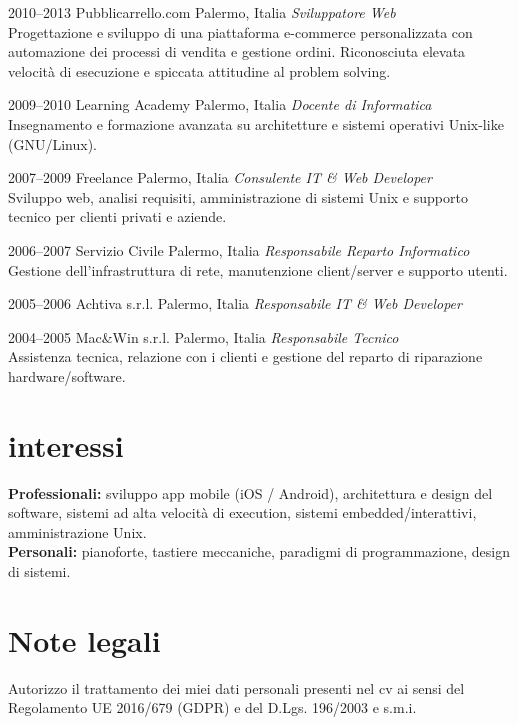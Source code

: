 \documentclass[]{friggeri-cv} %
\begin{document}
\begin{entrylist}
\entry
{2010--2013}
{Pubblicarrello.com}
{Palermo, Italia}
{\emph{Sviluppatore Web} \\
Progettazione e sviluppo di una piattaforma e-commerce personalizzata con automazione dei processi di vendita e gestione ordini. Riconosciuta elevata velocità di esecuzione e spiccata attitudine al problem solving.
}

\entry
{2009--2010}
{Learning Academy}
{Palermo, Italia}
{\emph{Docente di Informatica} \\
Insegnamento e formazione avanzata su architetture e sistemi operativi Unix-like (GNU/Linux).
}

\entry
{2007--2009}
{Freelance}
{Palermo, Italia}
{\emph{Consulente IT \& Web Developer} \\
Sviluppo web, analisi requisiti, amministrazione di sistemi Unix e supporto tecnico per clienti privati e aziende.
}

\entry
{2006--2007}
{Servizio Civile}
{Palermo, Italia}
{\emph{Responsabile Reparto Informatico} \\
Gestione dell'infrastruttura di rete, manutenzione client/server e supporto utenti.
}

\entry
{2005--2006}
{Achtiva s.r.l.}
{Palermo, Italia}
{\emph{Responsabile IT \& Web Developer} }

\entry
{2004--2005}
{Mac\&Win s.r.l.}
{Palermo, Italia}
{\emph{Responsabile Tecnico} \\
Assistenza tecnica, relazione con i clienti e gestione del reparto di riparazione hardware/software.
}

\end{entrylist}

\section{interessi}
\textbf{Professionali:} sviluppo app mobile (iOS / Android), architettura e design del software, sistemi ad alta velocità di execution, sistemi embedded/interattivi, amministrazione Unix. \\
\textbf{Personali:} pianoforte, tastiere meccaniche, paradigmi di programmazione, design di sistemi.

\section{Note legali}
Autorizzo il trattamento dei miei dati personali presenti nel cv ai sensi del Regolamento UE 2016/679 (GDPR) e del D.Lgs. 196/2003 e s.m.i.
\end{document}

